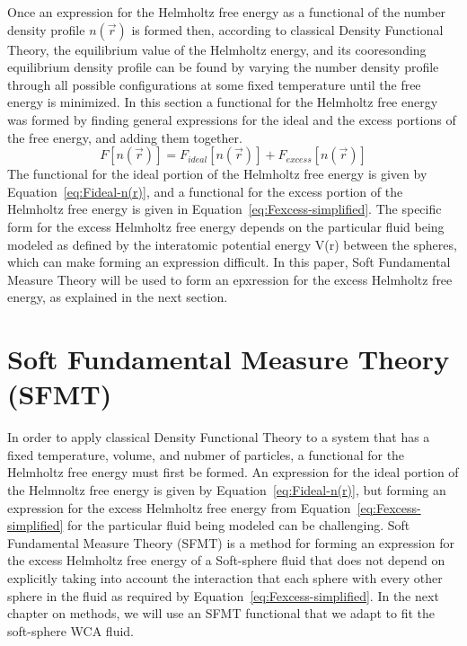 \documentclass[double,12pt]{beavtex}
\begin{document}

%
Once an expression for the Helmholtz free energy as a functional of the
number density profile $n(\vec r)$ is formed then, according to classical 
Density Functional Theory, the equilibrium value of the 
Helmholtz energy, and its cooresonding equilibrium density profile can be
found by varying the number density profile
through all possible configurations at some fixed temperature
until the free energy is minimized.  
In this section 
a functional for the Helmholtz free energy was formed by finding 
general expressions for the ideal and the excess portions of the free 
energy, and adding them together.
\begin{equation}{F[n(\vec{r})]=F_{ideal}[n(\vec{r})] + F_{excess}[n(\vec{r})]}\end{equation}
The functional for the ideal portion of the Helmholtz free energy is given by 
Equation~\ref{eq:Fideal-n(r)}, and a functional for the excess portion of the Helmholtz 
free energy is given in Equation~\ref{eq:Fexcess-simplified}. The specific 
form for the excess Helmholtz free energy depends on the particular 
fluid being modeled as defined by the  
interatomic potential energy V(r) between the spheres, which can make
forming an expression difficult. In this paper, Soft Fundamental Measure
Theory will be used to form an epxression for the excess Helmholtz free 
energy, as explained in the next section.

\section{Soft Fundamental Measure Theory (SFMT)}
In order to apply classical Density Functional Theory to a system that has
a fixed temperature, volume, and nubmer of particles, a functional for 
the Helmholtz free energy must first be formed. An expression for the ideal 
portion of the Helmnoltz free energy is given by Equation~\ref{eq:Fideal-n(r)}, 
but forming an expression for the excess Helmholtz free
energy from Equation~\ref{eq:Fexcess-simplified} for the particular fluid 
being modeled can be challenging. 
Soft Fundamental Measure Theory (SFMT) is a method for forming an 
expression for the excess Helmholtz free energy of a Soft-sphere fluid
that does not depend on  explicitly taking into account the interaction 
that each sphere with every other sphere in the fluid as required by 
Equation~\ref{eq:Fexcess-simplified}. In the next chapter on methods, we
will use an SFMT functional that we adapt to fit the soft-sphere WCA fluid.
\end{document}
